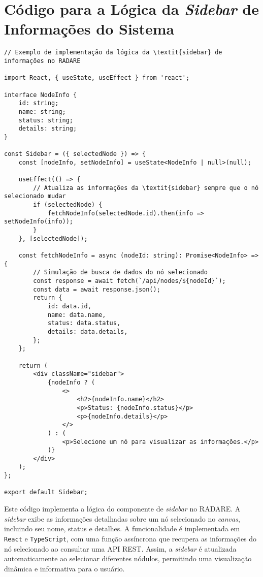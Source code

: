 \chapter{Código para a Lógica da \textit{Sidebar} de Informações do Sistema}
\label{Anexo:CodigoSidebar}

\begin{verbatim}
// Exemplo de implementação da lógica da \textit{sidebar} de informações no RADARE

import React, { useState, useEffect } from 'react';

interface NodeInfo {
    id: string;
    name: string;
    status: string;
    details: string;
}

const Sidebar = ({ selectedNode }) => {
    const [nodeInfo, setNodeInfo] = useState<NodeInfo | null>(null);

    useEffect(() => {
        // Atualiza as informações da \textit{sidebar} sempre que o nó selecionado mudar
        if (selectedNode) {
            fetchNodeInfo(selectedNode.id).then(info => setNodeInfo(info));
        }
    }, [selectedNode]);

    const fetchNodeInfo = async (nodeId: string): Promise<NodeInfo> => {
        // Simulação de busca de dados do nó selecionado
        const response = await fetch(`/api/nodes/${nodeId}`);
        const data = await response.json();
        return {
            id: data.id,
            name: data.name,
            status: data.status,
            details: data.details,
        };
    };

    return (
        <div className="sidebar">
            {nodeInfo ? (
                <>
                    <h2>{nodeInfo.name}</h2>
                    <p>Status: {nodeInfo.status}</p>
                    <p>{nodeInfo.details}</p>
                </>
            ) : (
                <p>Selecione um nó para visualizar as informações.</p>
            )}
        </div>
    );
};

export default Sidebar;
\end{verbatim}

Este código implementa a lógica do componente de \textit{sidebar} no RADARE. A \textit{sidebar} exibe as informações detalhadas sobre um nó selecionado no \textit{canvas}, incluindo seu nome, status e detalhes. A funcionalidade é implementada em \texttt{React} e \texttt{TypeScript}, com uma função assíncrona que recupera as informações do nó selecionado ao consultar uma API REST. Assim, a \textit{sidebar} é atualizada automaticamente ao selecionar diferentes nódulos, permitindo uma visualização dinâmica e informativa para o usuário.
